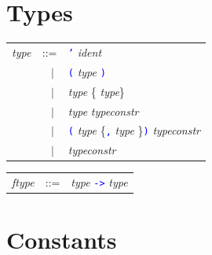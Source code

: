 \documentclass[11pt,titlepage,twoside]{report}
\newcommand{\alt}{\;|\;}
\newcommand{\term}[1]{\textcolor{Blue}{\tt #1}}
\newcommand{\nterm}[1]{\textcolor{BrickRed}{\it #1}}
\newcommand{\term}[1]{{\tt #1}}
\newcommand{\nterm}[1]{{\em #1}}
\begin{document}
\section{Types\label{typesftypes}} %

\begin{center}
\begin{tabular}{lcl}
\nterm{type} & ::=        & \term{'} \nterm{ident} \\
             & $\;\;\alt$ & \term{(} \nterm{type} \term{)} \\
             & $\;\;\alt$ & \nterm{type} \{\term{*} \nterm{type}\} \\
             & $\;\;\alt$ & \nterm{type} \nterm{typeconstr} \\
             & $\;\;\alt$ & \term{(} \nterm{type} \{\term{,}
                            \nterm{type} \}\term{)} \nterm{typeconstr} \\
             & $\;\;\alt$ & \nterm{typeconstr}
\end{tabular}
\end{center}

\begin{center}
  \begin{tabular}{lcl}
\nterm{ftype} & ::=        & \nterm{type} \term{->} \nterm{type}
  \end{tabular}
\end{center}


\section{Constants\label{constants}} %
\end{document}
